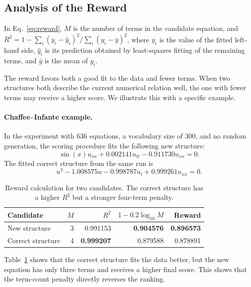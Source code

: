 \documentclass[11pt,letterpaper]{article}
\begin{document}
\subsection{Analysis of the Reward}
In Eq.~\eqref{eq:reward}, $M$ is the number of terms in the candidate equation, and $R^2=1-\sum_i(y_i-\hat y_i)^2/\sum_i(y_i-\bar y)^2$, where $y_i$ is the value of the fitted left-hand side, $\hat y_i$ is its prediction obtained by least-squares fitting of the remaining terms, and $\bar y$ is the mean of $y_i$.

The reward favors both a good fit to the data and fewer terms. When two structures both describe the current numerical relation well, the one with fewer terms may receive a higher score. We illustrate this with a specific example.

\paragraph{Chaffee--Infante example.}
In the experiment with 636 equations, a vocabulary size of 300, and no random generation, the scoring procedure fits the following new structure:
\begin{equation}\label{eq:wrong}
 \sin(x)u_{xx}+0.002141u_{tt}-0.911730u_{xx}=0.
\end{equation}
The fitted correct structure from the same run is
\begin{equation}\label{eq:correct}
 u^3-1.008575u-0.998787u_t+0.999261u_{xx}=0.
\end{equation}

\begin{table}[H]
\caption{Reward calculation for two candidates. The correct structure has a higher $R^2$ but a stronger four-term penalty.}\label{tab:reward}
\centering\small
\begin{tabular*}{\linewidth}{@{\extracolsep{\fill}}lrrrr@{}}\toprule
Candidate & $M$ & $R^2$ & $1-0.2\log_{10}M$ & Reward\\\midrule
New structure & 3 & 0.991153 & \textbf{0.904576} & \textbf{0.896573}\\
Correct structure & 4 & \textbf{0.999207} & 0.879588 & 0.878891\\\bottomrule
\end{tabular*}
\end{table}

Table~\ref{tab:reward} shows that the correct structure fits the data better, but the new equation has only three terms and receives a higher final score. This shows that the term-count penalty directly reverses the ranking.
\end{document}
